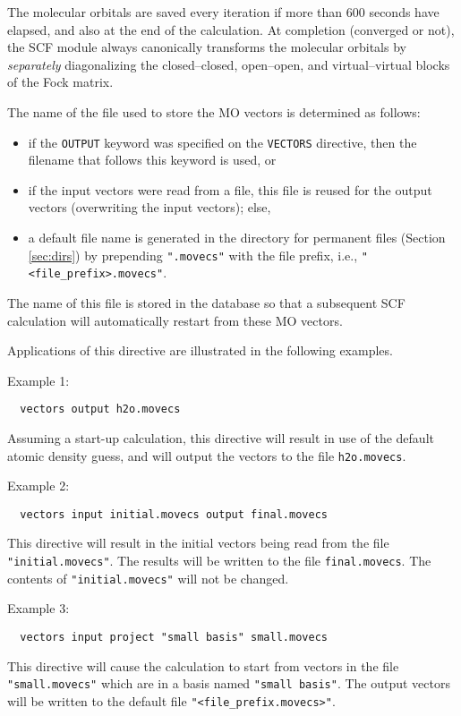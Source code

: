 The molecular orbitals are saved every iteration if more than 600
seconds have elapsed, and also at the end of the calculation.  At
completion (converged or not), the SCF module always canonically
transforms the molecular orbitals by {\em separately} diagonalizing
the closed--closed, open--open, and virtual--virtual blocks of the
Fock matrix.

The name of the file used to store the MO vectors is determined as
follows:
\begin{itemize}
\item if the \verb+OUTPUT+ keyword was specified on the \verb+VECTORS+
  directive, then the filename that follows this keyword is used, or
\item if the input vectors were read from a file, this file is reused
  for the output vectors (overwriting the input vectors); else,
\item a default file name is generated in the directory for permanent
  files (Section \ref{sec:dirs}) by prepending \verb+".movecs"+ with
  the file prefix, i.e., \verb+"<file_prefix>.movecs"+.
\end{itemize}
The name of this file is stored in the database so that a subsequent
SCF calculation will automatically restart from these MO vectors.

Applications of this directive are illustrated in the following
examples.

Example 1:
\begin{verbatim}
  vectors output h2o.movecs
\end{verbatim}
Assuming a start-up calculation, this directive will result in use of
the default atomic density guess, and will output the vectors to the
file \verb+h2o.movecs+.

Example 2:
\begin{verbatim}
  vectors input initial.movecs output final.movecs
\end{verbatim}
This directive will result in the initial vectors being read from the
file \verb+"initial.movecs"+.  The results will be written to the file
\verb+final.movecs+.  The contents of \verb+"initial.movecs"+ will not
be changed.

Example 3:
\begin{verbatim}
  vectors input project "small basis" small.movecs
\end{verbatim}
This directive will cause the calculation to start from vectors in the
file \verb+"small.movecs"+ which are in a basis named \verb+"small basis"+.
The output vectors will be written to the default file
\verb+"<file_prefix.movecs>"+.
 
